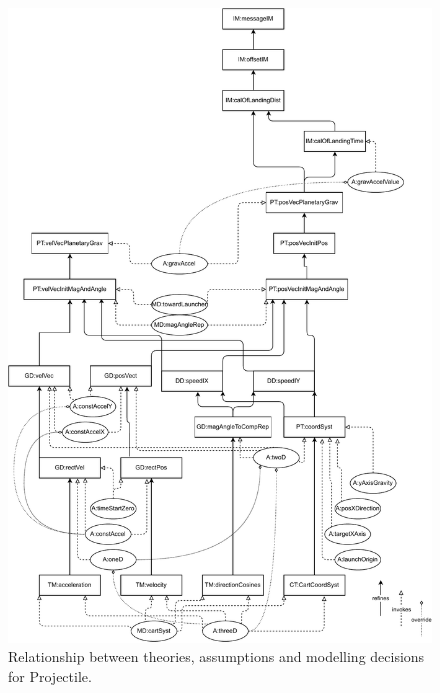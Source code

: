 \documentclass[12pt]{article}
\begin{document}
\begin{figure} \label{Fig:RelateTM2A2MD}
\caption{Relationship between theories, assumptions and modelling decisions for
Projectile.}
\begin{center}
\includegraphics[scale=0.6]{ProjectileTheoriesAssumpts.drawio.pdf}        
\end{center}
\end{figure}
\end{document}
